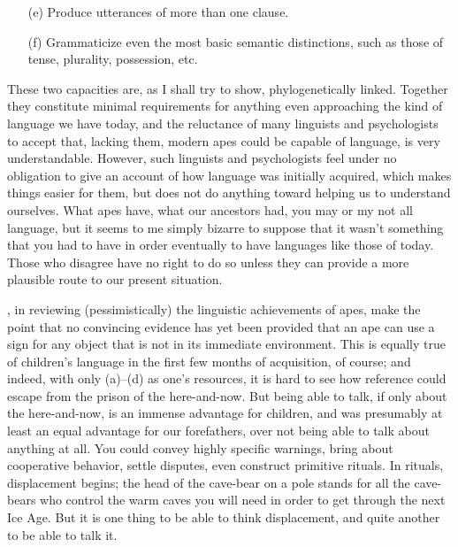 \begin{itemize}
\item[(e)] Produce utterances of more than one clause.
\item[(f)] Grammaticize even the most basic semantic distinctions, such as those of tense, plurality, possession, etc.
\end{itemize}

These two capacities are, as I shall try to show, phylogenetically linked. Together they constitute minimal requirements for anything even approaching the kind of language we have today, and the reluctance of many linguists and psychologists to accept that, lacking them, modern apes could be capable of language, is very understandable. However, such linguists and psychologists feel under no obligation to give an account of how language was initially acquired, which makes things easier for them, but does not do anything toward helping us to understand ourselves. What apes have, what our ancestors had, you may or my not all language, but it seems to me simply bizarre to suppose that it wasn't something that you had to have in order eventually to have languages like those of today. Those who disagree have no right to do so unless they can provide a more plausible route to our present situation.

\citet{Seidenberg1979}, in reviewing (pessimistically) the linguistic achievements of apes, make the point that no convincing evidence has yet been provided that an ape can use a sign for any object that is not in its immediate environment. This is equally true of children's language in the first few months of acquisition, of course; and indeed, with only (a)--(d) as one's resources, it is hard to see how reference could escape from the prison of the here-and-now. But being able to talk, if only about the here-and-now, is an immense advantage for children, and was presumably at least an equal advantage for our forefathers, over not being able to talk about anything at all. You could convey highly specific warnings, bring about cooperative behavior, settle disputes, even construct primitive rituals. In rituals, displacement begins; the head of the cave-bear on a pole stands for all the cave-bears who control the warm caves you will need in order to get through the next Ice Age. But it is one thing to be able to think displacement, and quite another to be able to talk it.


